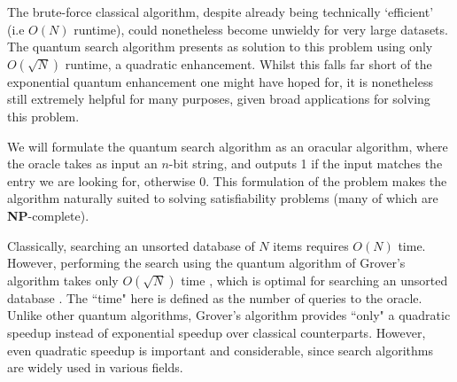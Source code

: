 \documentclass[aps,pra,singlecolumn,superscriptaddress]{revtex4-1}
\begin{document}
The brute-force classical algorithm, despite already being technically `efficient' (i.e $O(N)$ runtime), could nonetheless become unwieldy for very large datasets. The quantum search algorithm presents as solution to this problem using only $O(\sqrt{N})$ runtime, a quadratic enhancement. Whilst this falls far short of the exponential quantum enhancement one might have hoped for, it is nonetheless still extremely helpful for many purposes, given broad applications for solving this problem.

We will formulate the quantum search algorithm as an oracular algorithm, where the oracle takes as input an $n$-bit string, and outputs 1 if the input matches the entry we are looking for, otherwise 0. This formulation of the problem makes the algorithm naturally suited to solving satisfiability problems (many of which are \textbf{NP}-complete).






Classically, searching an unsorted database of $N$ items requires $O(N)$ time. However, performing the search using the quantum algorithm of Grover's algorithm takes only $O(\sqrt{N})$ time \cite{grover1997quantum}, which is optimal for searching an unsorted database \cite{bennett1997strengths, zalka1999grover}. The ``time" here is defined as the number of queries to the oracle. Unlike other quantum algorithms, Grover's algorithm provides ``only" a quadratic speedup instead of exponential speedup over classical counterparts. However, even quadratic speedup is important and considerable, since search algorithms are widely used in various fields.
\end{document}

